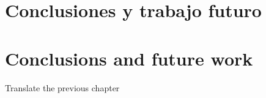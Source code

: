\chapter{Conclusiones y trabajo futuro}
	\blindtext


\chapter*{Conclusions and future work}
	Translate the previous chapter